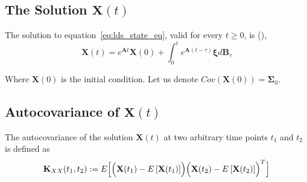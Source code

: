 \documentclass{article}
\begin{document}
%
\subsection*{The Solution $\mathbf{X}(t)$}
The solution to equation~\ref{eq:lds_state_eq}, valid for every $t\ge 0$, is (\citealp[\S3.7]{Pavliotis2014}),
\begin{equation}
\mathbf{X}(t)=e^{\mathbf{A}t}\mathbf{X}(0)+\int_0^t e^{\mathbf{A}(t-\tau)} \boldsymbol{\xi} d\mathbf{B}_\tau
\label{eq:ss_solution}
\end{equation}

Where $\mathbf{X}(0)$ is the initial condition. Let us denote $Cov \left ( \mathbf{X}(0) \right)=\mathbf{\Sigma}_0$. 
\subsection*{Autocovariance of $\mathbf{X}(t)$ }
The autocovariance of the solution $\mathbf{X}(t)$ at two arbitrary time points $t_1$ and $t_2$ is defined as
\begin{equation}
\mathbf{K}_{XX} (t_1, t_2) :=E\Bigl[\Bigl(\mathbf{X}(t_{1})-E\left [\mathbf{X}(t_{1}) \right] \Bigr) \Bigl(\mathbf{X}(t_{2})-E\left [\mathbf{X}(t_{2}) \right] \Bigr)^T \Bigr]
\end{equation}
\end{document}
